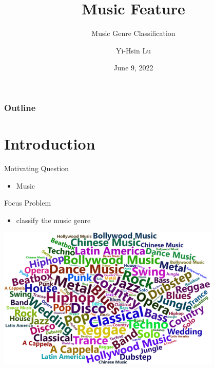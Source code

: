 \documentclass[11pt]{beamer}
\title{Music Feature}
\subtitle{Music Genre Classification}
\author{Yi-Hsin Lu}
\date{June 9, 2022}
\begin{document}
\begin{frame}
\titlepage
\end{frame}
\begin{frame}
    \frametitle{Outline}
    \tableofcontents%
\end{frame}

\section{Introduction}
\begin{frame}{Motivating Question}
\begin{itemize}
    \item Music
\end{itemize}
\end{frame}

\begin{frame}{Focus Problem}
\begin{itemize}
    \item classify the music genre
\end{itemize}
\begin{center}
    \includegraphics[width=0.8\textwidth]{wordCloud.png}
\end{center}
\end{frame}
\end{document}
